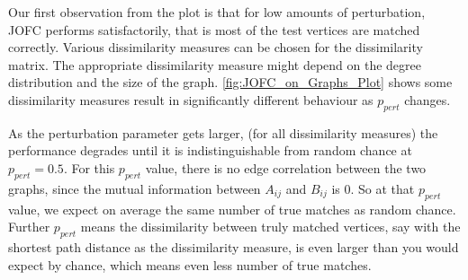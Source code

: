 \documentclass[12pt,oneside,final]{thesis}\usepackage[]{graphicx}\usepackage[]{color}
\makeatletter
\newenvironment{kframe}{%
 \def\at@end@of@kframe{}%
 \ifinner\ifhmode%
  \def\at@end@of@kframe{\end{minipage}}%
  \begin{minipage}{\columnwidth}%
 \fi\fi%
 \def\FrameCommand##1{\hskip\@totalleftmargin \hskip-\fboxsep
 \colorbox{shadecolor}{##1}\hskip-\fboxsep
     \hskip-\linewidth \hskip-\@totalleftmargin \hskip\columnwidth}%
 \MakeFramed {\advance\hsize-\width
   \@totalleftmargin\z@ \linewidth\hsize
   \@setminipage}}%
 {\par\unskip\endMakeFramed%
 \at@end@of@kframe}
\newenvironment{knitrout}{}{} %
\makeatother
\begin{document}
Our first observation from the plot is that for low amounts of perturbation, JOFC performs satisfactorily, that is most of the test vertices are matched correctly. Various dissimilarity measures can be chosen for the dissimilarity matrix. The appropriate dissimilarity measure might depend on the degree distribution and the size of the graph. \autoref{fig:JOFC_on_Graphs_Plot} shows some dissimilarity measures result in significantly different behaviour as $p_{pert}$  changes.

 As the perturbation parameter gets larger, (for all dissimilarity measures) the performance  degrades until it is indistinguishable from random chance at $p_{pert}=0.5$. For this $p_{pert}$ value, there is no edge correlation between the two graphs, since the mutual information between $A_{ij}$ and $B_{ij}$ is 0. So at that  $p_{pert}$ value, we expect on average the same number of true matches as random chance. Further $p_{pert}$ means the dissimilarity between truly matched vertices, say  with the shortest path distance as the dissimilarity measure, is even larger than you would expect by chance, which means even less number of true matches.




\begin{knitrout}
\color{fgcolor}\begin{kframe}


{\ttfamily\noindent\color{warningcolor}{\#\# Warning: there is no package called 'arrayhelpers'}}

{\ttfamily\noindent\bfseries{}}

{\ttfamily\noindent\bfseries{}}

{\ttfamily\noindent\bfseries\color{errorcolor}{\#\# Error: object 'nc.cmds.lf' not found}}

{\ttfamily\noindent\bfseries\color{errorcolor}{\#\# Error: object 'nc.jofc.lf' not found}}

{\ttfamily\noindent\bfseries\color{errorcolor}{\#\# Error: object 'nc.jofc.shortpath.lf' not found}}

{\ttfamily\noindent\bfseries\color{errorcolor}{\#\# Error: object 'nc.jofc.shortpath.lf' not found}}

{\ttfamily\noindent\bfseries{}}

{\ttfamily\noindent\bfseries{}}\end{kframe}
\end{knitrout}
\end{document}
